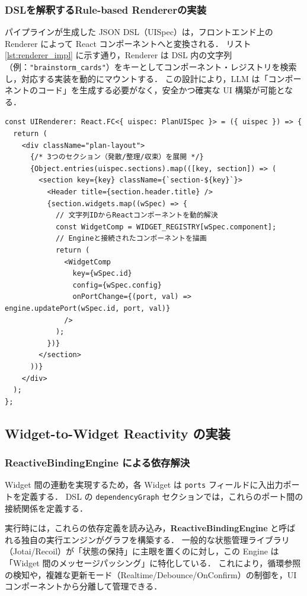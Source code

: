 \documentclass[a4paper,10pt]{jarticle}
\begin{document}
\subsubsection{DSLを解釈するRule-based Rendererの実装}
パイプラインが生成した JSON DSL（UISpec）は，フロントエンド上の Renderer によって React コンポーネントへと変換される．
リスト\ref{lst:renderer_impl} に示す通り，Renderer は DSL 内の文字列（例：\texttt{"brainstorm\_cards"}）をキーとしてコンポーネント・レジストリを検索し，対応する実装を動的にマウントする．
この設計により，LLM は「コンポーネントのコード」を生成する必要がなく，安全かつ確実な UI 構築が可能となる．

\begin{lstlisting}[caption = Rule-based Rendererの実装（React/TypeScript概要）, label = lst:renderer_impl]
const UIRenderer: React.FC<{ uispec: PlanUISpec }> = ({ uispec }) => {
  return (
    <div className="plan-layout">
      {/* 3つのセクション（発散/整理/収束）を展開 */}
      {Object.entries(uispec.sections).map(([key, section]) => (
        <section key={key} className={`section-${key}`}>
          <Header title={section.header.title} />
          {section.widgets.map((wSpec) => {
            // 文字列IDからReactコンポーネントを動的解決
            const WidgetComp = WIDGET_REGISTRY[wSpec.component];
            // Engineと接続されたコンポーネントを描画
            return (
              <WidgetComp 
                key={wSpec.id} 
                config={wSpec.config}
                onPortChange={(port, val) => engine.updatePort(wSpec.id, port, val)}
              />
            );
          })}
        </section>
      ))}
    </div>
  );
};
\end{lstlisting}

\subsection{Widget-to-Widget Reactivity の実装}


\subsubsection{ReactiveBindingEngine による依存解決}

Widget 間の連動を実現するため，各 Widget は \texttt{ports} フィールドに入出力ポートを定義する．
DSL の \texttt{dependencyGraph} セクションでは，これらのポート間の接続関係を定義する．

実行時には，これらの依存定義を読み込み，\textbf{ReactiveBindingEngine} と呼ばれる独自の実行エンジンがグラフを構築する．
一般的な状態管理ライブラリ（Jotai/Recoil）が「状態の保持」に主眼を置くのに対し，この Engine は「Widget 間のメッセージパッシング」に特化している．
これにより，循環参照の検知や，複雑な更新モード（Realtime/Debounce/OnConfirm）の制御を，UI コンポーネントから分離して管理できる．
\end{document}
